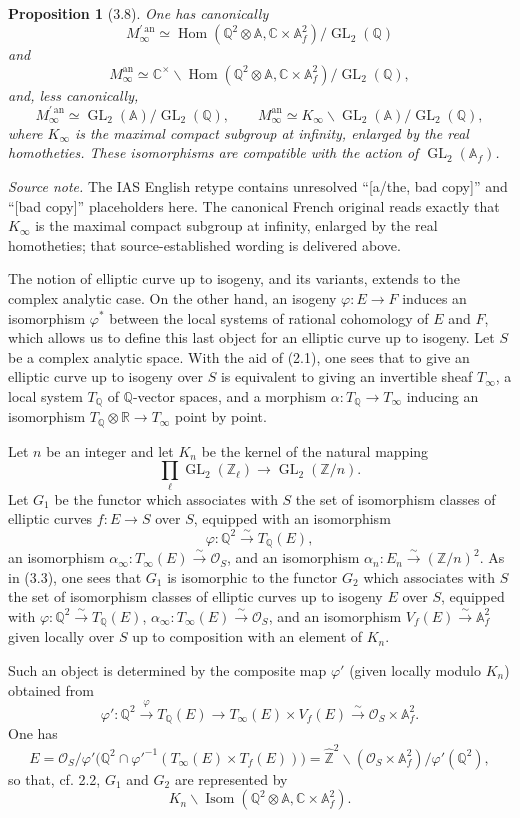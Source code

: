 \documentclass[10pt]{article}
\newcommand{\A}{\mathbb A}
\newcommand{\Af}{\mathbb A_f}
\newcommand{\C}{\mathbb C}
\newcommand{\Q}{\mathbb Q}
\newcommand{\R}{\mathbb R}
\newcommand{\Z}{\mathbb Z}
\newcommand{\bZ}{\widehat{\mathbb Z}}
\newcommand{\GL}{\operatorname{GL}}
\newcommand{\Hom}{\operatorname{Hom}}
\newcommand{\Isom}{\operatorname{Isom}}
\newcommand{\cO}{\mathcal O}
\newcommand{\an}{\mathrm{an}}
\newtheorem*{proposition}{Proposition}
\begin{document}
\begin{proposition}[3.8]
One has canonically
\[
M_\infty^{\prime\,\an}\simeq
\Hom(\Q^2\otimes\A,\C\times\Af^2)/\GL_2(\Q)
\]
and
\[
M_\infty^{\an}\simeq
\C^\times\backslash\Hom(\Q^2\otimes\A,\C\times\Af^2)/\GL_2(\Q),
\]
and, less canonically,
\[
M_\infty^{\prime\,\an}\simeq \GL_2(\A)/\GL_2(\Q),\qquad
M_\infty^{\an}\simeq K_\infty\backslash \GL_2(\A)/\GL_2(\Q),
\]
where $K_\infty$ is the maximal compact subgroup at infinity, enlarged by the real
homotheties. These
isomorphisms are compatible with the action of $\GL_2(\Af)$.
\end{proposition}
\noindent\emph{Source note.} The IAS English retype contains unresolved ``[a/the, bad copy]''
and ``[bad copy]'' placeholders here. The canonical French original reads exactly that
$K_\infty$ is the maximal compact subgroup at infinity, enlarged by the real homotheties;
that source-established wording is delivered above.

The notion of elliptic curve up to isogeny, and its variants, extends to the complex analytic
case. On the other hand, an isogeny $\varphi:E\to F$ induces an isomorphism $\varphi^*$
between the local systems of rational cohomology of $E$ and $F$, which allows us to define
this last object for an elliptic curve up to isogeny. Let $S$ be a complex analytic space.
With the aid of (2.1), one sees that to give an elliptic curve up to isogeny over $S$ is
equivalent to giving an invertible sheaf $T_\infty$, a local system $T_\Q$ of $\Q$-vector
spaces, and a morphism $\alpha:T_\Q\to T_\infty$ inducing an isomorphism
$T_\Q\otimes\R\to T_\infty$ point by point.

Let $n$ be an integer and let $K_n$ be the kernel of the natural mapping
\[
\prod_\ell \GL_2(\Z_\ell)\to \GL_2(\Z/n).
\]
Let $G_1$ be the functor which associates with $S$ the set of isomorphism classes of elliptic
curves $f:E\to S$ over $S$, equipped with an isomorphism
\[
\varphi:\Q^2\xrightarrow{\sim}T_\Q(E),
\]
an isomorphism $\alpha_\infty:T_\infty(E)\xrightarrow{\sim}\cO_S$, and an isomorphism
$\alpha_n:E_n\xrightarrow{\sim}(\Z/n)^2$. As in (3.3), one sees that $G_1$ is isomorphic
to the functor $G_2$ which associates with $S$ the set of isomorphism classes of elliptic
curves up to isogeny $E$ over $S$, equipped with $\varphi:\Q^2\xrightarrow{\sim}T_\Q(E)$,
$\alpha_\infty:T_\infty(E)\xrightarrow{\sim}\cO_S$, and an isomorphism
$V_f(E)\xrightarrow{\sim}\Af^2$ given locally over $S$ up to composition with an element
of $K_n$.

Such an object is determined by the composite map $\varphi'$ (given locally modulo $K_n$)
obtained from
\[
\varphi':\Q^2\xrightarrow{\varphi}T_\Q(E)
\longrightarrow T_\infty(E)\times V_f(E)
\xrightarrow{\sim}\cO_S\times \Af^2.
\]
One has
\[
E=
\cO_S\big/
\varphi'\bigl(\Q^2\cap \varphi'^{-1}(T_\infty(E)\times T_f(E))\bigr)
=
\bZ^2\backslash(\cO_S\times\Af^2)\big/\varphi'(\Q^2),
\]
so that, cf. 2.2, $G_1$ and $G_2$ are represented by
\[
K_n\backslash\Isom(\Q^2\otimes\A,\C\times\Af^2).
\]
\end{document}
